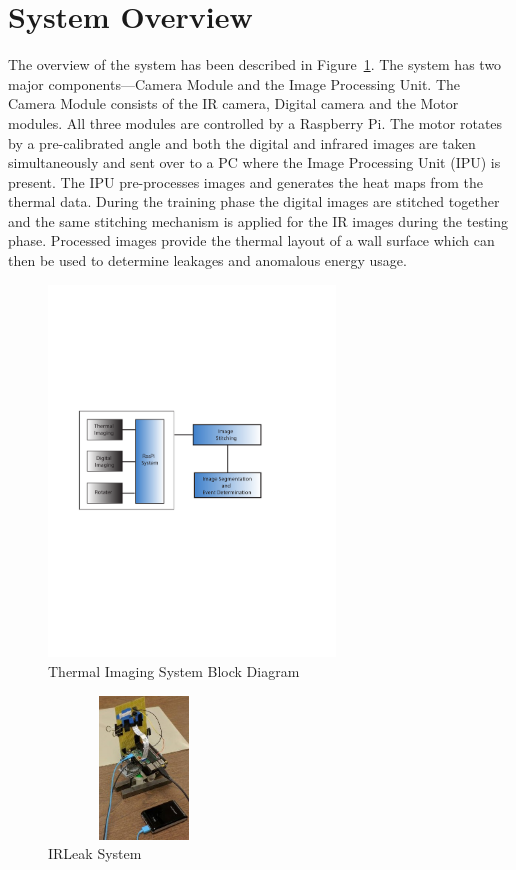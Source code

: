 \section{System Overview}

\indent The overview of the system has been described in Figure~\ref{fig:Overview}. The system has two major components---Camera Module and the Image Processing Unit. The Camera Module consists of the IR camera, Digital camera and the Motor modules. All three modules are controlled by a Raspberry Pi. The motor rotates by a pre-calibrated angle and both the digital and infrared images are taken simultaneously and sent over to a PC where the Image Processing Unit (IPU) is present. The IPU pre-processes images and generates the heat maps from the thermal data. During the training phase the digital images are stitched together and the same stitching mechanism is applied for the IR images during the testing phase. Processed images provide the thermal layout of a wall surface which can then be used to determine leakages and anomalous energy usage.


\begin{figure}[t!]
\begin{center}
	\includegraphics[width=3in]{figs/SystemArch.pdf}
\end{center}
  \caption{Thermal Imaging System Block Diagram}
  \label{fig:Overview}
\end{figure}

\begin{figure}[t!]
	\begin{center}
		\includegraphics[height=1.5in,width=2in]{figs/SystemDiagram}
	\end{center}
	\caption{IRLeak System}
	\label{fig:SystemDiagram}
\end{figure}